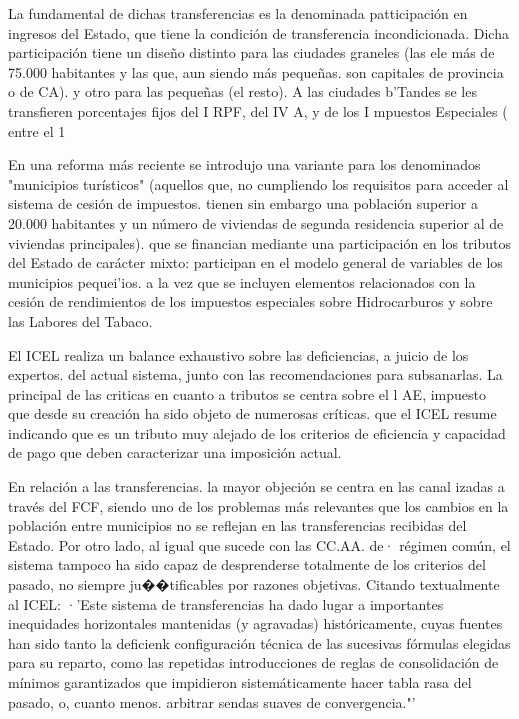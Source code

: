 \documentclass[10pt,a4paper]{article}
\begin{document}
{La fundamental de dichas transferencias es la denominada patticipación en ingresos del Estado, que tiene la condición de transferencia incondicionada. Dicha participación tiene un diseño distinto para las ciudades graneles (las ele más de 75.000 habitantes y las que, aun siendo más pequeñas. son capitales de provincia o de CA). y otro para las pequeñas (el resto). A las ciudades b'Tandes se les transfieren porcentajes fijos del I RPF, del IV A, y de los I mpuestos Especiales ( entre el 1 %

En una reforma más reciente se introdujo una variante para los denominados "municipios turísticos" (aquellos que, no cumpliendo los requisitos para acceder al sistema de cesión de impuestos. tienen sin embargo una población superior a 20.000 habitantes y un número de viviendas de segunda residencia superior al de viviendas principales). que se financian mediante una participación en los tributos del Estado de carácter mixto: participan en el modelo general de variables de los municipios pequei'ios. a la vez que se incluyen elementos relacionados con la cesión de rendimientos de los impuestos especiales sobre Hidrocarburos y sobre las Labores del Tabaco.

El ICEL realiza un balance exhaustivo sobre las deficiencias, a juicio de los expertos. del actual sistema, junto con las recomendaciones para subsanarlas. La principal de las criticas en cuanto a tributos se centra sobre el l AE, impuesto que desde su creación ha sido objeto de numerosas críticas. que el ICEL resume indicando que es un tributo muy alejado de los criterios de eficiencia y capacidad de pago que deben caracterizar una imposición actual.

En relación a las transferencias. la mayor objeción se centra en las canal izadas a través del FCF, siendo uno de los problemas más relevantes que los cambios en la población entre municipios no se reflejan en las transferencias recibidas del Estado. Por otro lado, al igual que sucede con las CC.AA. de· régimen común, el sistema tampoco ha sido capaz de desprenderse totalmente de los criterios del pasado, no siempre ju��tificables por razones objetivas. Citando textualmente al ICEL:
·'Este sistema de transferencias ha dado lugar a importantes inequidades horizontales mantenidas (y agravadas) históricamente, cuyas fuentes han sido tanto la deficienk configuración técnica de las sucesivas fórmulas elegidas para su reparto, como las repetidas introducciones de reglas de consolidación de mínimos garantizados que impidieron sistemáticamente hacer tabla rasa del pasado, o, cuanto menos. arbitrar sendas suaves de convergencia."'



}
\end{document}
